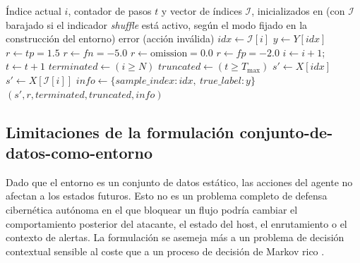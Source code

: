 \begin{algorithm}[htbp]
\caption[Paso de decisión del entorno]{Paso de decisión del entorno (\texttt{env.step}). Fuente: elaboración propia a partir de \texttt{src/rl\_defender\_env.py}.}
\label{alg:env-step}
\begin{algorithmic}[1]
\Require Índice actual $i$, contador de pasos $t$ y vector de índices $\mathcal{I}$, inicializados en  (con $\mathcal{I}$ barajado si el indicador \textit{shuffle} está activo, según el modo fijado en la construcción del entorno)
\Statex
{}
    \State \Return error (acción inválida)
  \EndIf
  \State $idx \gets \mathcal{I}[i]$
  \State $y \gets Y[idx]$ 
        \State $r \gets tp = 1.5$ 
     \Else
        \State $r \gets fn = -5.0$ 
     \EndIf
  \Else {}
        \State $r \gets \text{omission} = 0.0$ 
     \Else
        \State $r \gets fp = -2.0$ 
     \EndIf
  \EndIf
  \State $i \gets i+1$; \quad $t \gets t+1$ 
  \State $terminated \gets (i \geq N)$ 
  \State $truncated \gets (t \geq T_{\max})$ 
    \State $s' \gets X[idx]$ 
  \Else
    \State $s' \gets X[\mathcal{I}[i]]$ 
  \EndIf
  \State $info \gets \{sample\_index: idx,\ true\_label: y\}$
  \State \Return $(s', r, terminated, truncated, info)$
\EndFunction
\end{algorithmic}
\end{algorithm}

\subsection{Limitaciones de la formulación conjunto-de-datos-como-entorno}
Dado que el entorno es un conjunto de datos estático, las acciones del agente no afectan a los estados futuros. Esto no es un problema completo de defensa cibernética autónoma en el que bloquear un flujo podría cambiar el comportamiento posterior del atacante, el estado del host, el enrutamiento o el contexto de alertas. La formulación se asemeja más a un problema de decisión contextual sensible al coste que a un proceso de decisión de Markov rico \parencite{SuttonBarto2018RL,Levine2020OfflineRL}.

